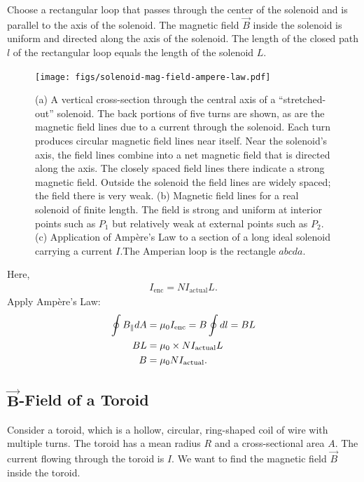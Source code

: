 \documentclass[12pt,b4paper]{article}
\begin{document}
Choose a rectangular loop that passes through the center of the solenoid and is parallel to the axis of the solenoid. The magnetic field $\vec{B}$ inside the solenoid is uniform and directed along the axis of the solenoid. The length of the closed path $l$ of the rectangular loop equals the length of the solenoid $L$.
\begin{figure}[H]
    \centering
    \texttt{[image: figs/solenoid-mag-field-ampere-law.pdf]}
    \caption{(a) A vertical cross-section through the central axis of a “stretched-out” solenoid. The back portions of five turns are shown, as are the magnetic field lines due to a current through the solenoid. Each turn produces circular magnetic field lines near itself. Near the solenoid’s axis, the field lines combine into a net magnetic field that is directed along the axis. The closely spaced field lines there indicate a strong magnetic field. Outside the solenoid the field lines are widely spaced; the field there is very weak. (b) Magnetic field lines for a real solenoid of finite length. The field is strong and uniform at interior points such as $P_1$ but relatively weak at external points such as $P_2$. (c) Application of Ampère’s Law to a section of a long ideal solenoid carrying a current $I$.The Amperian loop is the rectangle $abcda$.}
    \label{fig:solenoid-mag-field-ampere-law}
\end{figure}
Here,
\begin{align*}
    I_\text{enc}=NI_\text{actual}L.
\end{align*}
Apply Ampère's Law:
\begin{align}
    \oint B_\parallel dA&=\mu_0 I_\text{enc}=B\oint dl=BL\notag\\
    B L&=\mu_0 \times NI_\text{actual}L\notag\\
    B&=\mu_0NI_\text{actual}.
\end{align}
\subsection{$\boldsymbol{\vec{B}}$-Field of a Toroid}
Consider a toroid, which is a hollow, circular, ring-shaped coil of wire with multiple turns. The toroid has a mean radius $R$ and a cross-sectional area $A$. The current flowing through the toroid is $I$. We want to find the magnetic field $\vec{B}$ inside the toroid.
\end{document}
